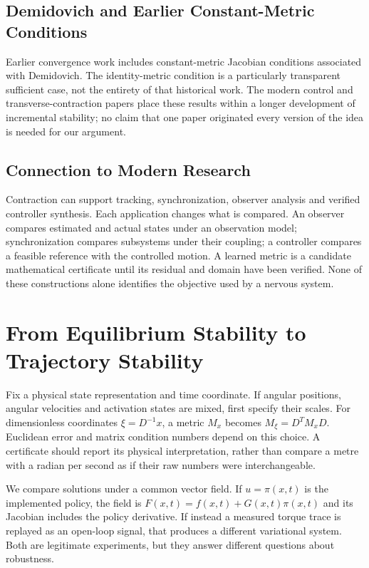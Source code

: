 \subsection{Demidovich and Earlier Constant-Metric Conditions}

Earlier convergence work includes constant-metric Jacobian conditions associated with Demidovich. The identity-metric condition is a particularly transparent sufficient case, not the entirety of that historical work. The modern control and transverse-contraction papers place these results within a longer development of incremental stability; no claim that one paper originated every version of the idea is needed for our argument.

\subsection{Connection to Modern Research}

Contraction can support tracking, synchronization, observer analysis and verified controller synthesis. Each application changes what is compared. An observer compares estimated and actual states under an observation model; synchronization compares subsystems under their coupling; a controller compares a feasible reference with the controlled motion. A learned metric is a candidate mathematical certificate until its residual and domain have been verified. None of these constructions alone identifies the objective used by a nervous system.

\section{From Equilibrium Stability to Trajectory Stability}

Fix a physical state representation and time coordinate. If angular positions, angular velocities and activation states are mixed, first specify their scales. For dimensionless coordinates $\xi=D^{-1}x$, a metric $M_x$ becomes $M_\xi=D^T M_xD$. Euclidean error and matrix condition numbers depend on this choice. A certificate should report its physical interpretation, rather than compare a metre with a radian per second as if their raw numbers were interchangeable.

We compare solutions under a common vector field. If $u=\pi(x,t)$ is the implemented policy, the field is $F(x,t)=f(x,t)+G(x,t)\pi(x,t)$ and its Jacobian includes the policy derivative. If instead a measured torque trace is replayed as an open-loop signal, that produces a different variational system. Both are legitimate experiments, but they answer different questions about robustness.

